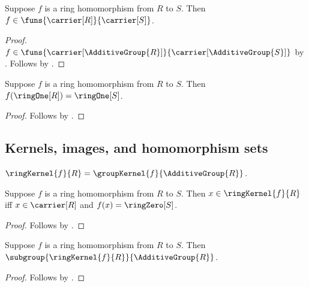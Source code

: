 \begin{proposition}\label{ring_hom_type}
    Suppose $f$ is a ring homomorphism from $R$ to $S$.
    Then $f\in\funs{\carrier[R]}{\carrier[S]}$.
\end{proposition}
\begin{proof}
    $f\in\funs{\carrier[\AdditiveGroup{R}]}{
        \carrier[\AdditiveGroup{S}]}$ by
        .
    Follows by .
\end{proof}

\begin{proposition}\label{ring_hom_one}
    Suppose $f$ is a ring homomorphism from $R$ to $S$.
    Then $f(\ringOne[R])=\ringOne[S]$.
\end{proposition}
\begin{proof}
    Follows by
        .
\end{proof}

\subsection{Kernels, images, and homomorphism sets}

\begin{definition}\label{ring_kernel}
    $\ringKernel{f}{R}=\groupKernel{f}{\AdditiveGroup{R}}$.
\end{definition}

\begin{proposition}\label{ring_kernel_iff}
    Suppose $f$ is a ring homomorphism from $R$ to $S$.
    Then $x\in\ringKernel{f}{R}$ iff
        $x\in\carrier[R]$ and $f(x)=\ringZero[S]$.
\end{proposition}
\begin{proof}
    Follows by
        .
\end{proof}

\begin{theorem}\label{ring_kernel_is_additive_subgroup}
    Suppose $f$ is a ring homomorphism from $R$ to $S$.
    Then $\subgroup{\ringKernel{f}{R}}{\AdditiveGroup{R}}$.
\end{theorem}
\begin{proof}
    Follows by
        .
\end{proof}

